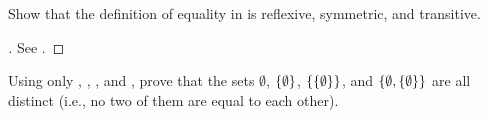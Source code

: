 \exercisesection

\begin{ex}\label{i:ex:3.1.1}
  Show that the definition of equality in  is reflexive, symmetric, and transitive.
\end{ex}

\begin{proof}[]
  See .
\end{proof}

\begin{ex}\label{i:ex:3.1.2}
  Using only , , , and , prove that the sets \(\emptyset\), \(\left\lbrace\emptyset\right\rbrace\), \(\left\lbrace\left\lbrace\emptyset\right\rbrace\right\rbrace\), and \(\left\lbrace\emptyset, \left\lbrace\emptyset\right\rbrace\right\rbrace\) are all distinct
  (i.e., no two of them are equal to each other).
\end{ex}

